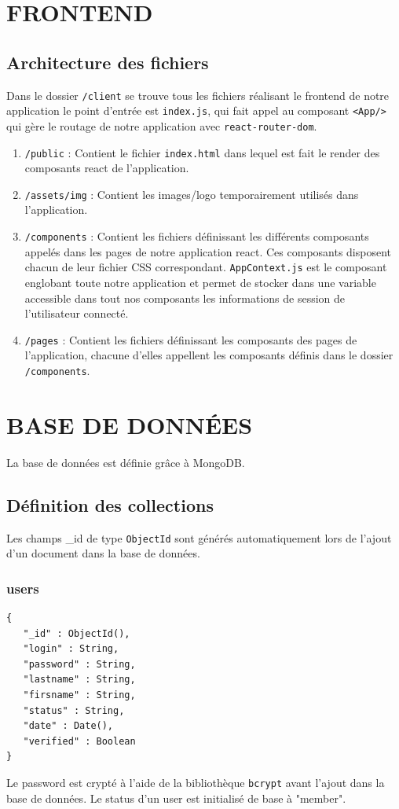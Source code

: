 \documentclass{article}
\begin{document}
\newpage

\section{FRONTEND}

\subsection*{Architecture des fichiers}
Dans le dossier \texttt{/client} se trouve tous les fichiers réalisant le frontend de notre application le point d'entrée est \texttt{index.js}, qui fait appel au composant \texttt{<App/>} qui gère le routage de notre application avec \texttt{react-router-dom}.

\begin{enumerate}
    \item \texttt{/public} : Contient le fichier \texttt{index.html} dans lequel est fait le render des composants react de l'application.
    \item \texttt{/assets/img} : Contient les images/logo temporairement utilisés dans l'application.
    \item \texttt{/components} : Contient les fichiers définissant les différents composants appelés dans les pages de notre application react. Ces composants disposent chacun de leur fichier CSS correspondant. \texttt{AppContext.js} est le composant englobant toute notre application et permet de stocker dans une variable accessible dans tout nos composants les informations de session de l'utilisateur connecté.
    \item \texttt{/pages} : Contient les fichiers définissant les composants des pages de l'application, chacune d'elles appellent les composants définis dans le dossier \texttt{/components}.
\end{enumerate}

\section{BASE DE DONNÉES}
La base de données est définie grâce à MongoDB.

\subsection*{Définition des collections}
Les champs \_id de type \texttt{ObjectId} sont générés automatiquement lors de l'ajout d'un document dans la base de données.

\subsubsection*{users}
\begin{verbatim}
{
   "_id" : ObjectId(),
   "login" : String,
   "password" : String,
   "lastname" : String,
   "firsname" : String,
   "status" : String,
   "date" : Date(),
   "verified" : Boolean
}
\end{verbatim}
Le password est crypté à l'aide de la bibliothèque \texttt{bcrypt} avant l'ajout dans la base de données. Le status d'un user est initialisé de base à "member".
\end{document}

